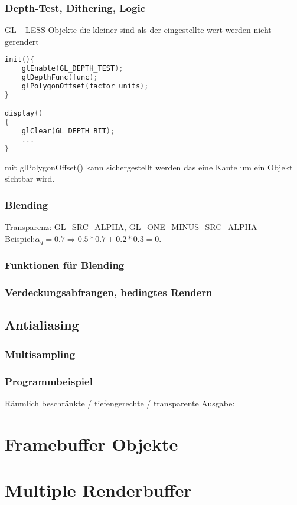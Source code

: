 \subsubsection{Depth-Test, Dithering, Logic}
GL\_ LESS Objekte die kleiner sind als der eingestellte wert werden nicht gerendert
\begin{lstlisting}[language=C++]
init(){
	glEnable(GL_DEPTH_TEST);
	glDepthFunc(func);
	glPolygonOffset(factor units);
}

display()
{
	glClear(GL_DEPTH_BIT);
	...
}
\end{lstlisting}
mit glPolygonOffset() kann sichergestellt werden das eine Kante um ein Objekt sichtbar wird.
\subsubsection{Blending}
Transparenz: GL\_SRC\_ALPHA, GL\_ONE\_MINUS\_SRC\_ALPHA\\
Beispiel:$\alpha_q = 0.7 \Rightarrow 0.5*0.7+0.2*0.3 = 0.$
\subsubsection*{Funktionen für Blending}
\subsubsection{Verdeckungsabfrangen, bedingtes Rendern}
\subsection{Antialiasing}
\subsubsection{Multisampling}
\subsubsection*{Programmbeispiel}
Räumlich beschränkte / tiefengerechte / transparente Ausgabe:
\section{Framebuffer Objekte}
\section{Multiple Renderbuffer}
